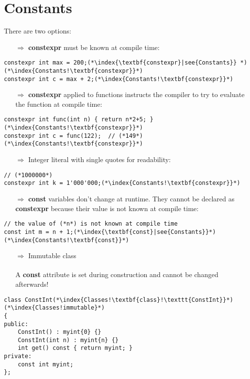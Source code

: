 \documentclass[10pt]{article}
\begin{document}
\section{Constants}
\small
There are two options:
\begin{enumerate}
\item[$\Rightarrow$] \textbf{constexpr} must be known at compile time:
\end{enumerate}
\begin{lstlisting}
constexpr int max = 200;(*\index{\textbf{constexpr}|see{Constants}} *)(*\index{Constants!\textbf{constexpr}}*)
constexpr int c = max + 2;(*\index{Constants!\textbf{constexpr}}*)
\end{lstlisting}
\begin{enumerate}
\item[$\Rightarrow$] \textbf{constexpr} applied to functions instructs the compiler to try to evaluate the function at compile time:
\end{enumerate}
\begin{lstlisting}
constexpr int func(int n) { return n*2+5; }(*\index{Constants!\textbf{constexpr}}*)
constexpr int c = func(122);  // (*149*)(*\index{Constants!\textbf{constexpr}}*)
\end{lstlisting}
\begin{enumerate}
\item[$\Rightarrow$] Integer literal with single quotes for readability:
\end{enumerate}
\begin{lstlisting}
// (*1000000*)
constexpr int k = 1'000'000;(*\index{Constants!\textbf{constexpr}}*)
\end{lstlisting}
\begin{enumerate}
\item[$\Rightarrow$] \textbf{const} variables don't change at runtime. They cannot be declared as
\textbf{constexpr} because their value is not known at compile time:
\end{enumerate}
\begin{lstlisting}
// the value of (*n*) is not known at compile time
const int m = n + 1;(*\index{\textbf{const}|see{Constants}}*)(*\index{Constants!\textbf{const}}*)
\end{lstlisting}
\begin{enumerate}
\item[$\Rightarrow$] Immutable class\\ \\ A \textbf{const} attribute is set during construction and cannot be changed afterwards!
\end{enumerate}
\begin{lstlisting}
class ConstInt(*\index{Classes!\textbf{class}!\texttt{ConstInt}}*)(*\index{Classes!immutable}*)
{
public:
    ConstInt() : myint{0} {}
    ConstInt(int n) : myint{n} {}
    int get() const { return myint; }
private:
    const int myint;
};
\end{lstlisting}
%
%
\end{document}
